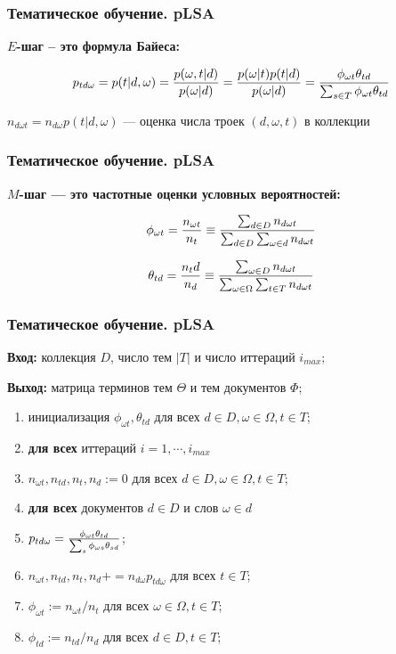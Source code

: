 \documentclass[ucs, notheorems, handout]{beamer}
\begin{document}
			\begin{frame}
	\frametitle{Тематическое обучение. pLSA}
	
\textbf{$E$-шаг -- это формула Байеса:}

$$p_{td\omega} = p(t | d, \omega) = { {p(\omega , t | d)} \over {p(\omega | d)}} = { {p(\omega | t) p(t|d)} \over {p(\omega | d)}}= {{\phi_{\omega t}\theta_{td}} \over {\sum_{s \in T}\phi_{\omega t}\theta_{td}}}$$

$n_{d \omega t} = n_{d \omega}p(t | d, \omega)$ --- оценка числа троек $(d, \omega, t)$ в коллекции
	\end{frame}

		\begin{frame}
	\frametitle{Тематическое обучение. pLSA}
	
\textbf{$M$-шаг --- это частотные оценки условных вероятностей:}

$$ \phi_{\omega t} = {{n_{\omega t}} \over {n_t}} \equiv {{\sum_{d \in D} n_{d \omega t}} \over {\sum_{d \in D} \sum_{\omega \in d} n_{d \omega t}}} $$

$$ \theta_{td} = { {n_td} \over {n_d}} \equiv {{\sum_{\omega \in D} n_{d \omega t}} \over {\sum_{\omega \in \Omega} \sum_{t \in T} n_{d \omega t}}}$$
	\end{frame}
	
			\begin{frame}
	\frametitle{Тематическое обучение. pLSA}
	
\textbf{Вход:} коллекция $D$, число тем $|T|$ и число иттераций $i_{max}$;
	
\textbf{Выход:} матрица терминов тем $\Theta$ и тем документов $\Phi$;

\begin{enumerate}
		\item инициализация $\phi_{\omega t}, \theta_{td}$ для всех $d \in D, \omega \in \Omega, t \in T$; 
		\item \textbf{для всех} иттераций $i=1, \cdots, i_{max}$ 
		\item \quad $n_{\omega t}, n_{td}, n_t, n_d := 0$ для всех $d \in D, \omega \in \Omega, t \in T$; 
		\item \quad \textbf{для всех} документов  $d \in D$ и слов $\omega \in d$
		\item \quad \quad $p_{td\omega} = {{\phi_{\omega t} \theta_{td}} \over {\sum_{s} \phi_{\omega s} \theta_{sd}}}$; 
		\item \quad \quad $n_{\omega t}, n_{td}, n_t, n_d += n_{d \omega} p_{td \omega}$ для всех $t \in T$;
		\item \quad $\phi_{\omega t} := n_{\omega t}/n_t$ для всех $\omega \in \Omega, t \in T$;
		\item \quad $\phi_{td} := n_{td}/n_d$ для всех $d \in D, t \in T$;

\end{enumerate}
	\end{frame}
\end{document}
